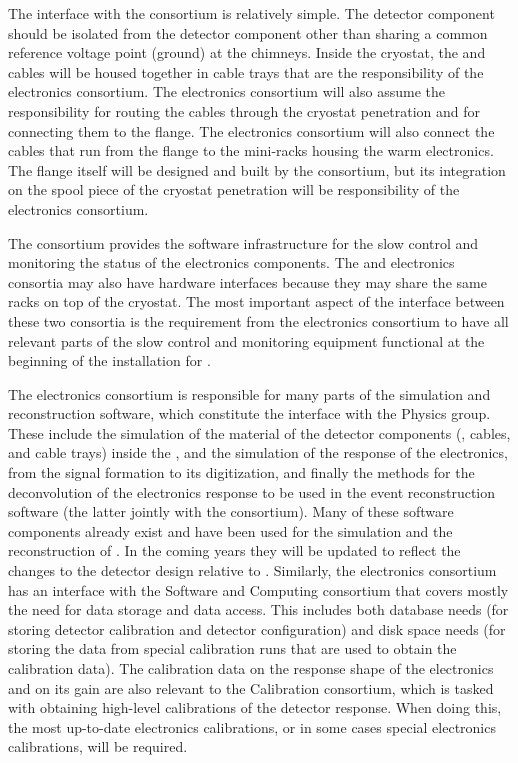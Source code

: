 The interface with the  consortium is relatively simple.
The  detector component should be isolated from the 
detector component other than sharing a common reference 
voltage point (ground) at the chimneys. Inside the cryostat, the 
 and  cables will be housed together in
cable trays that are the responsibility of the  electronics
consortium. The  electronics consortium will also assume
the responsibility for routing the  cables through the
cryostat penetration and for connecting them to the 
flange. The  electronics consortium will also connect
the cables that run from the flange
to the mini-racks housing the  warm electronics. 
The flange itself will be designed and built by the 
consortium, but its integration on the spool piece
of the cryostat penetration will be responsibility of the  electronics
consortium.

The  consortium provides the software infrastructure for the slow
control and monitoring the status of the  electronics components.
The  and  electronics consortia may also have hardware
interfaces because they may share the same racks on top of the
cryostat. The most important aspect of the interface between these
two consortia is the requirement from the  electronics consortium
to have all relevant parts of the slow control and monitoring
equipment functional at the beginning
of the installation for . 

The  electronics consortium is responsible for many parts of
the  simulation and reconstruction software, which constitute
the interface with the Physics group. These include the
simulation of the material of the detector components (, cables, and
cable trays) inside the , and the simulation
of the response of the electronics, from the signal formation to its 
digitization, and finally the methods for the deconvolution of the electronics
response to be used in the event reconstruction software (the latter jointly
with the  consortium). Many of these
software components already exist and have been used for the simulation
and the reconstruction of . In the coming years they will be
updated to reflect the changes to the detector design relative to 
. Similarly, the 
electronics consortium has an interface with the Software and Computing
consortium that covers mostly the need for data storage and data access.
This includes both database needs (for storing detector calibration
and detector configuration) and disk space needs (for storing the data 
from special calibration runs that are used to obtain the calibration
data). The calibration data on the response shape of the electronics and
on its gain are also relevant to the Calibration consortium,
which is tasked with obtaining high-level calibrations of the detector
response. When doing this, the most up-to-date electronics calibrations,
or in some cases special electronics calibrations, will be required.
